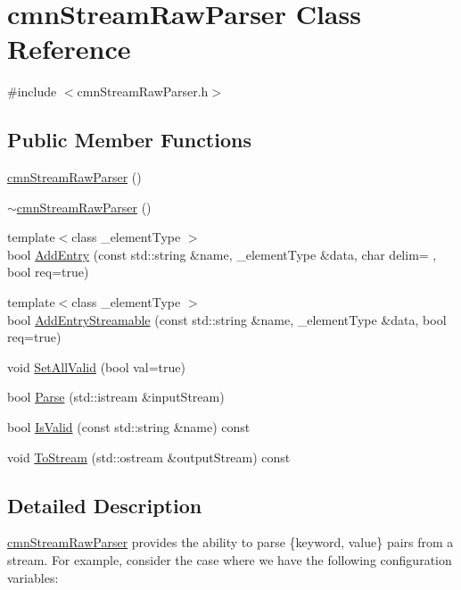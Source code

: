 \hypertarget{classcmn_stream_raw_parser}{}\section{cmn\+Stream\+Raw\+Parser Class Reference}
\label{classcmn_stream_raw_parser}


{\ttfamily \#include $<$cmn\+Stream\+Raw\+Parser.\+h$>$}

\subsection*{Public Member Functions}
\begin{DoxyCompactItemize}
\item 
\hyperlink{classcmn_stream_raw_parser_a17a4741c2c4b13d84549b7f182fc4858}{cmn\+Stream\+Raw\+Parser} ()
\item 
\hyperlink{classcmn_stream_raw_parser_afe4a08697751aa20fe0a7a91ce8cb917}{$\sim$cmn\+Stream\+Raw\+Parser} ()
\item 
{\footnotesize template$<$class \+\_\+element\+Type $>$ }\\bool \hyperlink{classcmn_stream_raw_parser_a85682f38234f9f9c9c452240511f52ba}{Add\+Entry} (const std\+::string \&name, \+\_\+element\+Type \&data, char delim= \textquotesingle{} \textquotesingle{}, bool req=true)
\item 
{\footnotesize template$<$class \+\_\+element\+Type $>$ }\\bool \hyperlink{classcmn_stream_raw_parser_a6fd698505c5456edf6659d2eb3c7525c}{Add\+Entry\+Streamable} (const std\+::string \&name, \+\_\+element\+Type \&data, bool req=true)
\item 
void \hyperlink{classcmn_stream_raw_parser_a88730a1b1051f68bf00fade19bef41cf}{Set\+All\+Valid} (bool val=true)
\item 
bool \hyperlink{classcmn_stream_raw_parser_aa414a151c05b00e73c20d1ed13c94d7a}{Parse} (std\+::istream \&input\+Stream)
\item 
bool \hyperlink{classcmn_stream_raw_parser_a5fb2061460327342e5a9b772272bccec}{Is\+Valid} (const std\+::string \&name) const 
\item 
void \hyperlink{classcmn_stream_raw_parser_a34cc22ae5fb87be3563dbce530bc6e1d}{To\+Stream} (std\+::ostream \&output\+Stream) const 
\end{DoxyCompactItemize}


\subsection{Detailed Description}
\hyperlink{classcmn_stream_raw_parser}{cmn\+Stream\+Raw\+Parser} provides the ability to parse \{keyword, value\} pairs from a stream. For example, consider the case where we have the following configuration variables\+:



